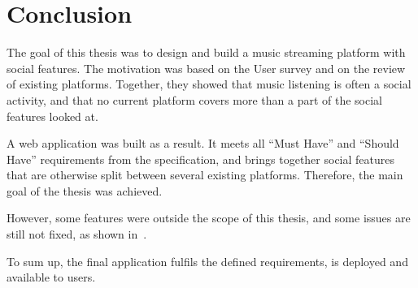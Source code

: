 \chapter{Conclusion}\label{ch:conclusion}

The goal of this thesis was to design and build a music streaming
platform with social features. The motivation was based on the User
survey and on the review of existing platforms. Together, they showed
that music listening is often a social activity, and that no
current platform covers more than a part of the social features
looked at.

A web application was built as a result. It meets all ``Must Have''
and ``Should Have'' requirements from the specification, and brings
together social features that are otherwise split between several
existing platforms. Therefore, the main goal of the thesis was
achieved.

However, some features were outside the scope of this thesis, and some
issues are still not fixed, as shown in~.

To sum up, the final application fulfils the defined requirements, is
deployed and available to users.
